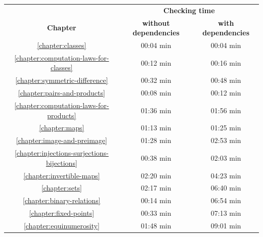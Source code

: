 \documentclass[12pt,oneside]{book}
\begin{document}
  \begin{center}
    \begin{tabular}{c|c|c}

      & \multicolumn{2}{c}{\textbf{Checking time}}
      \\
      \textbf{Chapter}
      & \textbf{without dependencies}     & \textbf{with dependencies}
      \\ \hline
      \ref{chapter:classes}
      & 00:04 min                         & 00:04 min
      \\
      \ref{chapter:computation-laws-for-classes}
      & 00:12 min                         & 00:16 min
      \\
      \ref{chapter:symmetric-difference}
      & 00:32 min                         & 00:48 min
      \\
      \ref{chapter:pairs-and-products}
      & 00:08 min                         & 00:12 min
      \\
      \ref{chapter:computation-laws-for-products}
      & 01:36 min                         & 01:56 min
      \\
      \ref{chapter:maps}
      & 01:13 min                         & 01:25 min
      \\
      \ref{chapter:image-and-preimage}
      & 01:28 min                         & 02:53 min
      \\
      \ref{chapter:injections-surjections-bijections}
      & 00:38 min                         & 02:03 min
      \\
      \ref{chapter:invertible-maps}
      & 02:20 min                         & 04:23 min
      \\
      \ref{chapter:sets}
      & 02:17 min                         & 06:40 min
      \\
      \ref{chapter:binary-relations}
      & 00:14 min                         & 06:54 min
      \\
      \ref{chapter:fixed-points}
      & 00:33 min                         & 07:13 min
      \\
      \ref{chapter:equinumerosity}
      & 01:48 min                         & 09:01 min
    \end{tabular}
  \end{center}


  
  
  
  
  
  
  
  
  
  
  
  
  
\end{document}
